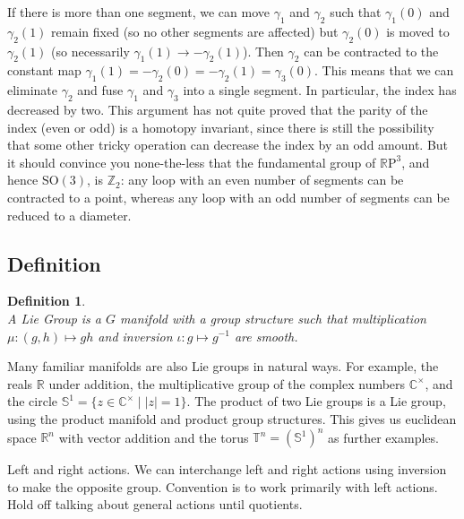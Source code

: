 \documentclass[twoside,11pt,a4paper,leqno]{article}
\numberwithin{equation}{section}
\theoremstyle{plain}
\newtheorem{definition}[equation]{Definition}
\theoremstyle{definition}
\newcommand{\bbC}{\mathbb{C}}
\newcommand{\bbR}{\mathbb{R}}
\newcommand{\bbS}{\mathbb{S}}
\newcommand{\bbT}{\mathbb{T}}
\newcommand{\bbZ}{\mathbb{Z}}
\newcommand{\RP}{\mathbb{R}\mathrm{P}}
\newcommand{\SO}{\mathrm{SO}}
\begin{document}
If there is more than one segment, we can move $\gamma_1$ and $\gamma_2$ such that $\gamma_1(0)$ and $\gamma_2(1)$ remain fixed (so no other segments are affected) but $\gamma_2(0)$ is moved to $\gamma_2(1)$ (so necessarily $\gamma_1(1) \to - \gamma_2(1)$).
Then $\gamma_2$ can be contracted to the constant map $\gamma_1(1) = -\gamma_2(0) = -\gamma_2(1) = \gamma_3(0)$.
This means that we can eliminate $\gamma_2$ and fuse $\gamma_1$ and $\gamma_3$ into a single segment.
In particular, the index has decreased by two.
This argument has not quite proved that the parity of the index (even or odd) is a homotopy invariant, since there is still the possibility that some other tricky operation can decrease the index by an odd amount. 
But it should convince you none-the-less that the fundamental group of $\RP^3$, and hence $\SO(3)$, is $\bbZ_2$:
any loop with an even number of segments can be contracted to a point, whereas any loop with an odd number of segments can be reduced to a diameter.


\subsection{Definition}

\begin{definition}
\textup{\cite[3.1]{Warner1983}\cite[Definition~1.20]{Hall2015}} \\
A \emph{Lie Group} is a $G$ manifold with a group structure such that multiplication $\mu : (g,h) \mapsto gh$ and inversion $\iota : g \mapsto g^{-1}$ are smooth.
\end{definition}

Many familiar manifolds are also Lie groups in natural ways.
For example, the reals $\bbR$ under addition, the multiplicative group of the complex numbers $\bbC^\times$, and the circle $\bbS^1 = \{ z \in \bbC^\times \mid |z| = 1 \}$.
The product of two Lie groups is a Lie group, using the product manifold and product group structures.
This gives us euclidean space $\bbR^n$ with vector addition and the torus $\bbT^n = (\bbS^1)^n$ as further examples.

Left and right actions.
We can interchange left and right actions using inversion to make the opposite group.
Convention is to work primarily with left actions.
Hold off talking about general actions until quotients.
\end{document}
